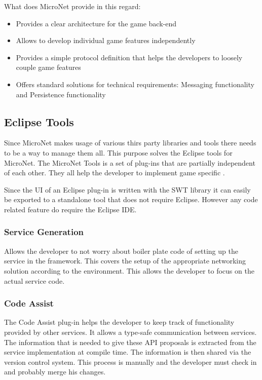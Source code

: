 What does MicroNet provide in this regard:
\begin{itemize}
  \item Provides a clear architecture for the game back-end
  \item Allows to develop individual game features independently
  \item Provides a simple protocol definition that helps the developers to loosely couple game features
  \item Offers standard solutions for technical requirements: Messaging
  functionality and Persistence functionality	
\end{itemize}

\subsection{Eclipse Tools}

Since MicroNet makes usage of various thirs party libraries and tools there
needs to be a way to manage them all. This purpose solves the Eclipse tools for
MicroNet. The MicroNet Tools is a set of plug-ins that are partially independent
of each other. They all help the developer to implement game specific \mss{}.

Since the UI of an Eclipse plug-in is written with the SWT library it can easily
be exported to a standalone tool that does not require Eclipse. However any code
related feature do require the Eclipse IDE.

\subsubsection{Service Generation}

Allows the developer to not worry about boiler plate code of setting up the
service in the framework. This covers the setup of the appropriate networking
solution according to the environment. This allows the developer to focus on the
actual service code.

\subsubsection{Code Assist}

The Code Assist plug-in helps the developer to keep track of functionality
provided by other services. It allows a type-safe communication between
services. The information that is needed to give these API proposals is
extracted from the service implementation at compile time. The information is
then shared via the version control system. This process is manually and the
developer must check in and probably merge his changes. 

